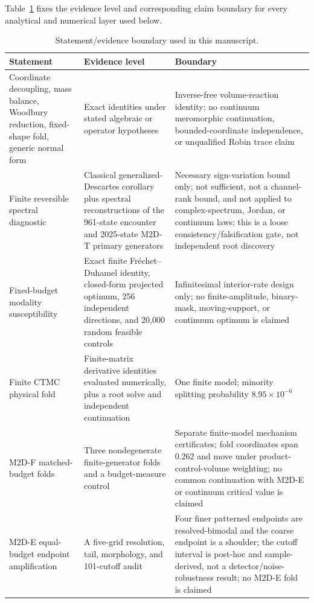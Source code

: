 \documentclass[aps,pre,reprint,amsmath,amssymb,longbibliography,floatfix]{revtex4-2}
\begin{document}
Table~\ref{tab:evidence} fixes the evidence level and corresponding claim
boundary for every analytical and numerical layer used below.

\begin{table}[!t]
\caption{\label{tab:evidence}
Statement/evidence boundary used in this manuscript.}
\begin{ruledtabular}
\begin{tabular}{p{}p{}p{}}
Statement & Evidence level & Boundary\\
\hline
Coordinate decoupling, mass balance, Woodbury reduction, fixed-shape fold,
generic normal form
& Exact identities under stated algebraic or operator hypotheses
& Inverse-free volume-reaction identity; no continuum meromorphic continuation,
bounded-coordinate independence, or unqualified Robin trace claim\\
Finite reversible spectral diagnostic
& Classical generalized-Descartes corollary plus spectral reconstructions of
the 961-state encounter and 2025-state M2D-T primary generators
& Necessary sign-variation bound only; not sufficient, not a channel-rank
bound, and not applied to complex-spectrum, Jordan, or continuum laws; this is
a loose consistency/falsification gate, not independent root discovery\\
Fixed-budget modality susceptibility
& Exact finite Fr\'echet--Duhamel identity, closed-form projected optimum, 256
independent directions, and 20,000 random feasible controls
& Infinitesimal interior-rate design only; no finite-amplitude, binary-mask,
moving-support, or continuum optimum is claimed\\
Finite CTMC physical fold
& Finite-matrix derivative identities evaluated numerically, plus a root solve and independent
continuation
& One finite model; minority splitting probability
\(8.95\times10^{-6}\)\\
M2D-F matched-budget folds
& Three nondegenerate finite-generator folds and a budget-measure control
& Separate finite-model mechanism certificates; fold coordinates span
\(0.262\) and move under product-control-volume weighting; no common
continuation with M2D-E or continuum critical value is claimed\\
M2D-E equal-budget endpoint amplification
& A five-grid resolution, tail, morphology, and 101-cutoff audit
& Four finer patterned endpoints are resolved-bimodal and the coarse endpoint
is a shoulder; the cutoff interval is post-hoc and sample-derived, not a
detector/noise-robustness result; no M2D-E fold is claimed\\

\end{tabular}
\end{ruledtabular}
\end{table}
\end{document}
